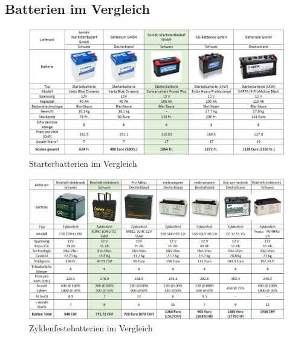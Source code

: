 \begin{appendix} %
\begin{landscape}
\section{Batterien im Vergleich}\label{appsec:Batterie}


\begin{figure}[H]
	\begin{center}
		\includegraphics[width=240mm]{appendix/BatterieStart.png}
		\caption[Starterbatterien]{Starterbatterien im Vergleich} %
		\label{fig:Starterbatterie}
	\end{center}
\end{figure}

\begin{figure}[H]
	\begin{center}
		\includegraphics[width=240mm]{appendix/BatterieZyklenfest.png}
		\caption[Zyklenfestebatterien]{Zyklenfestebatterien im Vergleich} %
		\label{fig:Zyklenfestebatterie}
	\end{center}
\end{figure}
\end{landscape}

\end{appendix}
